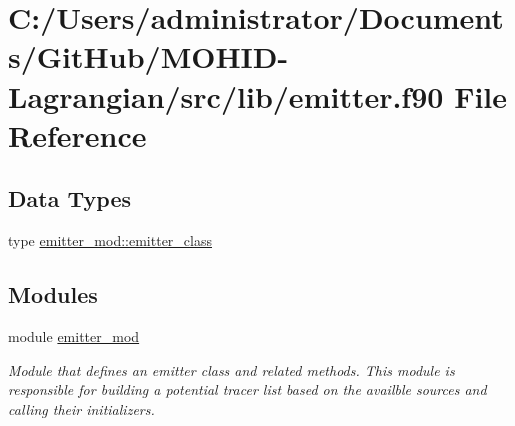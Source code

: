 \hypertarget{emitter_8f90}{}\section{C\+:/\+Users/administrator/\+Documents/\+Git\+Hub/\+M\+O\+H\+I\+D-\/\+Lagrangian/src/lib/emitter.f90 File Reference}
\label{emitter_8f90}
\subsection*{Data Types}
\begin{DoxyCompactItemize}
\item 
type \hyperlink{structemitter__mod_1_1emitter__class}{emitter\+\_\+mod\+::emitter\+\_\+class}
\end{DoxyCompactItemize}
\subsection*{Modules}
\begin{DoxyCompactItemize}
\item 
module \hyperlink{namespaceemitter__mod}{emitter\+\_\+mod}
\begin{DoxyCompactList}\small\item\em Module that defines an emitter class and related methods. This module is responsible for building a potential tracer list based on the availble sources and calling their initializers. \end{DoxyCompactList}\end{DoxyCompactItemize}
